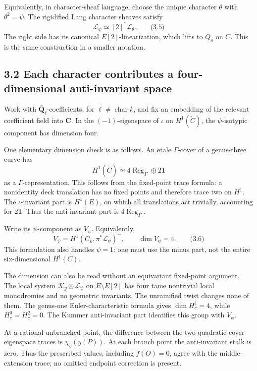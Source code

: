 \documentclass[
  11pt,
  a4paper,
]{article}
\begin{document}
Equivalently, in character-sheaf language, choose the unique character
\(\theta\) with \(\theta^2=\psi\). The rigidified Lang character sheaves
satisfy \[
\mathcal L_\psi\simeq[2]^*\mathcal L_\theta.
\qquad \text{(3.5)}
\] The right side has its canonical \(E[2]\)-linearization, which lifts
to \(Q_8\) on \(C\). This is the same construction in a smaller
notation.

\subsection{3.2 Each character contributes a four-dimensional
anti-invariant
space}\label{each-character-contributes-a-four-dimensional-anti-invariant-space}

Work with \(\overline{\mathbf Q}_\ell\)-coefficients, for
\(\ell\ne\operatorname{char}k\), and fix an embedding of the relevant
coefficient field into \(\mathbf C\). In the \((-1)\)-eigenspace of
\(\iota\) on \(H^1(\widetilde C)\), the \(\psi\)-isotypic component has
dimension four.

One elementary dimension check is as follows. An etale \(\Gamma\)-cover
of a genus-three curve has \[
H^1(\widetilde C)\simeq4\operatorname{Reg}_\Gamma\oplus2\mathbf1
\] as a \(\Gamma\)-representation. This follows from the fixed-point
trace formula: a nonidentity deck translation has no fixed points and
therefore trace two on \(H^1\). The \(\iota\)-invariant part is
\(H^1(E)\), on which all translations act trivially, accounting for
\(2\mathbf1\). Thus the anti-invariant part is
\(4\operatorname{Reg}_\Gamma\).

Write its \(\psi\)-component as \(V_\psi\). Equivalently, \[
V_\psi=H^1(C_{\bar k},\pi^*\mathcal L_\psi)^-,
\qquad \dim V_\psi=4.
\qquad \text{(3.6)}
\] This formulation also handles \(\psi=1\): one must use the minus
part, not the entire six-dimensional \(H^1(C)\).

The dimension can also be read without an equivariant fixed-point
argument. The local system \(\mathcal K_y\otimes\mathcal L_\psi\) on
\(E\setminus E[2]\) has four tame nontrivial local monodromies and no
geometric invariants. The unramified twist changes none of them. The
genus-one Euler-characteristic formula gives \(\dim H_c^1=4\), while
\(H_c^0=H_c^2=0\). The Kummer anti-invariant part identifies this group
with \(V_\psi\).

At a rational unbranched point, the difference between the two
quadratic-cover eigenspace traces is \(\chi_q(y(P))\). At each branch
point the anti-invariant stalk is zero. Thus the prescribed values,
including \(f(O)=0\), agree with the middle-extension trace; no omitted
endpoint correction is present.
\end{document}
